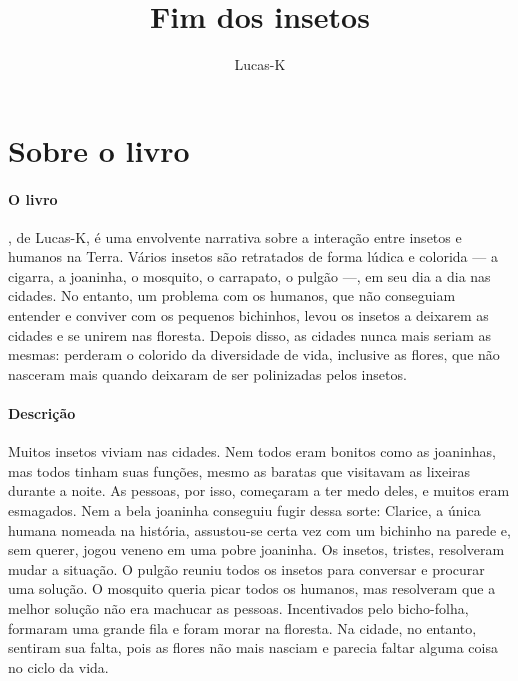 \documentclass[11pt]{extarticle}
\newcommand{\AutorLivro}{Lucas-K}
\newcommand{\TituloLivro}{Fim dos insetos}
\newcommand{\colaborador}{{Paulo Pompermaier e Renier Silva}}
\begin{document}
\title{\TituloLivro}
\author{\AutorLivro}
\def\authornotes{\colaborador}

\date{}
\maketitle


\tableofcontents



\section{Sobre o livro}

\paragraph{O livro} , de Lucas-K, é uma envolvente narrativa sobre a interação entre insetos e humanos na Terra. Vários insetos são retratados de forma lúdica e colorida --- a cigarra, a joaninha, o mosquito, o carrapato, o pulgão ---, em seu dia a dia nas cidades. No entanto, um problema com os humanos, que não conseguiam entender e conviver com os pequenos bichinhos, levou os insetos a deixarem as cidades e se unirem nas floresta. Depois disso, as cidades nunca mais seriam as mesmas: perderam o colorido da diversidade de vida, inclusive as flores, que não nasceram mais quando deixaram de ser polinizadas pelos insetos.

\paragraph{Descrição} Muitos insetos viviam nas cidades. Nem todos eram bonitos como as joaninhas, mas todos tinham suas funções, mesmo as baratas que visitavam as lixeiras durante a noite. As pessoas, por isso, começaram a ter medo deles, e muitos eram esmagados. Nem a bela joaninha conseguiu fugir dessa sorte: Clarice, a única humana nomeada na história, assustou-se certa vez com um bichinho na parede e, sem querer, jogou veneno em uma pobre joaninha. Os insetos, tristes, resolveram mudar a situação. O pulgão reuniu todos os insetos para conversar e procurar uma solução. O mosquito queria picar todos os humanos, mas resolveram que a melhor solução não era machucar as pessoas. Incentivados pelo bicho-folha, formaram uma grande fila e foram morar na floresta. Na cidade, no entanto, sentiram sua falta, pois as flores não mais nasciam e parecia faltar alguma coisa no ciclo da vida.
\end{document}
